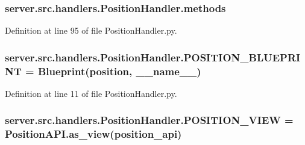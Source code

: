 \subsubsection[{\texorpdfstring{methods}{methods}}]{\setlength{\rightskip}{0pt plus 5cm}server.\+src.\+handlers.\+Position\+Handler.\+methods}\hypertarget{namespaceserver_1_1src_1_1handlers_1_1_position_handler_a4ef9b677a2f5dbe64fdde90cebed0fd0}{}\label{namespaceserver_1_1src_1_1handlers_1_1_position_handler_a4ef9b677a2f5dbe64fdde90cebed0fd0}


Definition at line 95 of file Position\+Handler.\+py.

\subsubsection[{\texorpdfstring{P\+O\+S\+I\+T\+I\+O\+N\+\_\+\+B\+L\+U\+E\+P\+R\+I\+NT}{POSITION_BLUEPRINT}}]{\setlength{\rightskip}{0pt plus 5cm}server.\+src.\+handlers.\+Position\+Handler.\+P\+O\+S\+I\+T\+I\+O\+N\+\_\+\+B\+L\+U\+E\+P\+R\+I\+NT = Blueprint(\textquotesingle{}position\textquotesingle{}, \+\_\+\+\_\+name\+\_\+\+\_\+)}\hypertarget{namespaceserver_1_1src_1_1handlers_1_1_position_handler_af32524e2038716670566b3c521694b2d}{}\label{namespaceserver_1_1src_1_1handlers_1_1_position_handler_af32524e2038716670566b3c521694b2d}


Definition at line 11 of file Position\+Handler.\+py.

\subsubsection[{\texorpdfstring{P\+O\+S\+I\+T\+I\+O\+N\+\_\+\+V\+I\+EW}{POSITION_VIEW}}]{\setlength{\rightskip}{0pt plus 5cm}server.\+src.\+handlers.\+Position\+Handler.\+P\+O\+S\+I\+T\+I\+O\+N\+\_\+\+V\+I\+EW = Position\+A\+P\+I.\+as\+\_\+view(\textquotesingle{}position\+\_\+api\textquotesingle{})}\hypertarget{namespaceserver_1_1src_1_1handlers_1_1_position_handler_acacbb3f690b46e8115e7b0bd92ea2929}{}\label{namespaceserver_1_1src_1_1handlers_1_1_position_handler_acacbb3f690b46e8115e7b0bd92ea2929}


